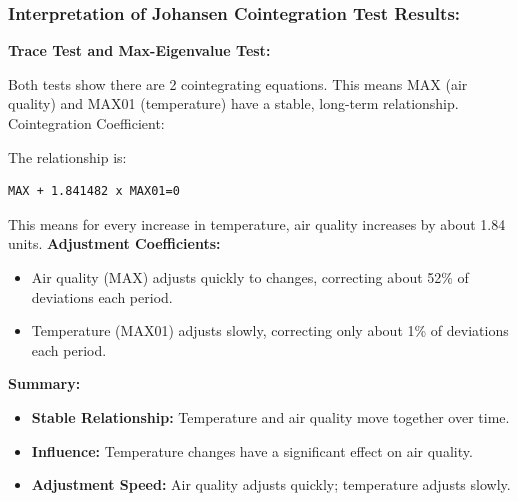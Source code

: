\documentclass{article} %
\begin{document}
\pagebreak
\subsubsection*{Interpretation of Johansen Cointegration Test Results:}
\textbf{Trace Test and Max-Eigenvalue Test:}

Both tests show there are 2 cointegrating equations. This means MAX (air quality) and MAX01 (temperature) have a stable, long-term relationship.
Cointegration Coefficient:

The relationship is:
\begin{verbatim}
MAX + 1.841482 x MAX01=0
\end{verbatim} 
This means for every increase in temperature, air quality increases by about 1.84 units.
\textbf{Adjustment Coefficients:}
\begin{itemize}
    \item Air quality (MAX) adjusts quickly to changes, correcting about 52\% of deviations each period.
    \item Temperature (MAX01) adjusts slowly, correcting only about 1\% of deviations each period.
\end{itemize}

\textbf{Summary:}
\begin{itemize}
    \item \textbf{Stable Relationship:} Temperature and air quality move together over time.
    \item \textbf{Influence:} Temperature changes have a significant effect on air quality.
    \item \textbf{Adjustment Speed:} Air quality adjusts quickly; temperature adjusts slowly.
\end{itemize}
\end{document}
